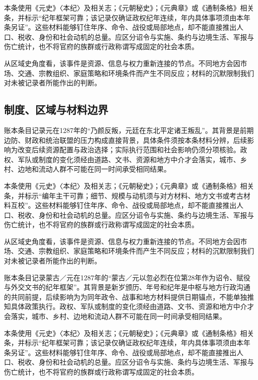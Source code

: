 本条使用《元史》〈本纪〉及相关志；《元朝秘史》；《元典章》或《通制条格》相关条，并标示“纪年框架可靠；该记录仅确证政权纪年连续，年内具体事项须由本年条另证”。这些材料能够钉住年序、命令、战役或局部地点，却不能直接推出人口、税收、身份和社会动机的总量。应区分诏令与实施、条约与边境生活、军报与伤亡统计，也不将官府的族群或行政称谓写成固定的社会本质。

从区域史角度看，该事件是资源、信息与权力重新连接的节点。不同地方会因市场、交通、宗教组织、家庭策略和环境条件而产生不同反应；材料的沉默限制我们对未被记录者所能作出的判断。

\subsection{制度、区域与材料边界}

账本条目记录元在1287年的“乃颜反叛，元廷在东北平定诸王叛乱”。其背景是前期边防、财政和统治联盟的压力构成直接背景，具体条件须按本条材料分辨，后续影响为改变后续资源配置与政治选择；实际执行范围和社会影响仍须分项核验。政权、军队或制度的变化须经由道路、文书、资源和地方中介才会落实，城市、乡村、边地和流动人群不可能在同一时间承受相同结果。

本条使用《元史》〈本纪〉及相关志；《元朝秘史》；《元典章》或《通制条格》相关条，并标示“编年主干可靠；细节、规模与动机须与对方材料、地方文书或考古材料互校”。这些材料能够钉住年序、命令、战役或局部地点，却不能直接推出人口、税收、身份和社会动机的总量。应区分诏令与实施、条约与边境生活、军报与伤亡统计，也不将官府的族群或行政称谓写成固定的社会本质。

从区域史角度看，该事件是资源、信息与权力重新连接的节点。不同地方会因市场、交通、宗教组织、家庭策略和环境条件而产生不同反应；材料的沉默限制我们对未被记录者所能作出的判断。

账本条目记录蒙古／元在1287年的“蒙古／元以忽必烈在位第28年作为诏令、赋役与外交文书的纪年框架”。其背景是新岁颁历、年号和纪年是中枢与地方行政沟通的共同前提，后续影响为为同年政令、战事和地方材料提供日期锚点，不能单独推知具体政策执行。政权、军队或制度的变化须经由道路、文书、资源和地方中介才会落实，城市、乡村、边地和流动人群不可能在同一时间承受相同结果。

本条使用《元史》〈本纪〉及相关志；《元朝秘史》；《元典章》或《通制条格》相关条，并标示“纪年框架可靠；该记录仅确证政权纪年连续，年内具体事项须由本年条另证”。这些材料能够钉住年序、命令、战役或局部地点，却不能直接推出人口、税收、身份和社会动机的总量。应区分诏令与实施、条约与边境生活、军报与伤亡统计，也不将官府的族群或行政称谓写成固定的社会本质。

